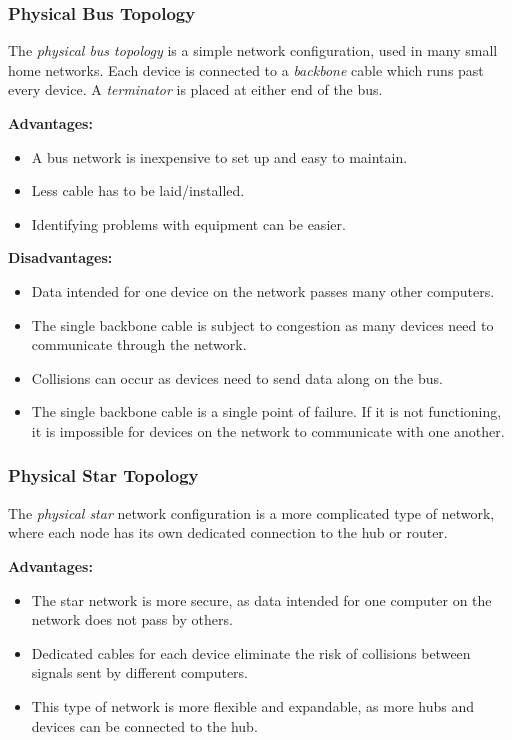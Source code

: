 \documentclass[9pt]{article}
\begin{document}
\subsubsection{Physical Bus Topology}
\label{sec:org946d4a6}

The \emph{physical bus topology} is a simple network configuration, used in many small home networks. Each device is connected to a \emph{backbone} cable which runs past every device. A \emph{terminator} is placed at either end of the bus.

\textbf{Advantages:}

\begin{itemize}
\item A bus network is inexpensive to set up and easy to maintain.
\item Less cable has to be laid/installed.
\item Identifying problems with equipment can be easier.
\end{itemize}

\textbf{Disadvantages:}

\begin{itemize}
\item Data intended for one device on the network passes many other computers.
\item The single backbone cable is subject to congestion as many devices need to communicate through the network.
\item Collisions can occur as devices need to send data along on the bus.
\item The single backbone cable is a single point of failure. If it is not functioning, it is impossible for devices on the network to communicate with one another.
\end{itemize}

\subsubsection{Physical Star Topology}
\label{sec:org9080515}

The \emph{physical star} network configuration is a more complicated type of network, where each node has its own dedicated connection to the hub or router.

\textbf{Advantages:}

\begin{itemize}
\item The star network is more secure, as data intended for one computer on the network does not pass by others.
\item Dedicated cables for each device eliminate the risk of collisions between signals sent by different computers.
\item This type of network is more flexible and expandable, as more hubs and devices can be connected to the hub.
\end{itemize}
\end{document}
